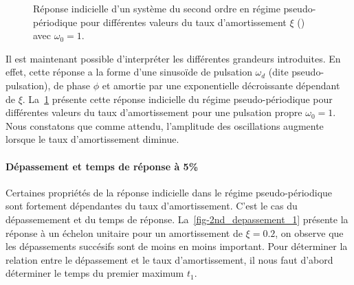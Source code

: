 \begin{figure}[!t]
\begin{center}
\caption{Réponse indicielle d'un système du second ordre en régime 
         pseudo-périodique pour différentes valeurs du taux d'amortissement 
         $\xi$ () avec $\omega_0=1$. \label{fig-2nd_pp}}
\end{center}
\end{figure}

Il est maintenant possible d'interpréter les différentes grandeurs 
introduites. En effet, cette réponse a la forme d'une sinuso\"ide 
de pulsation $\omega_d$ (dite pseudo-pulsation), de phase $\phi$ et 
amortie par une exponentielle décroissante dépendant de $\xi$.
La~\cref{fig-2nd_pp} présente cette réponse indicielle du régime 
pseudo-périodique pour différentes valeurs du taux d'amortissement pour 
une pulsation propre $\omega_0=1$. Nous constatons que comme attendu, 
l'amplitude des oscillations augmente lorsque le taux d'amortissement diminue.

\newpage
\paragraph{Dépassement et temps de réponse à 5\%}
Certaines propriétés de la réponse indicielle dans le régime pseudo-périodique 
sont fortement dépendantes du taux d'amortissement. C'est le cas du 
dépassemement et du temps de réponse. La~\cref{fig-2nd_depassement_1} présente 
la réponse à un échelon unitaire pour un amortissement de $\xi=0.2$, 
on observe que les dépassements succésifs sont de moins en moins important. 
Pour déterminer la relation entre le dépassement et le taux d'amortissement, 
il nous faut d'abord déterminer le temps du premier maximum $t_1$.

